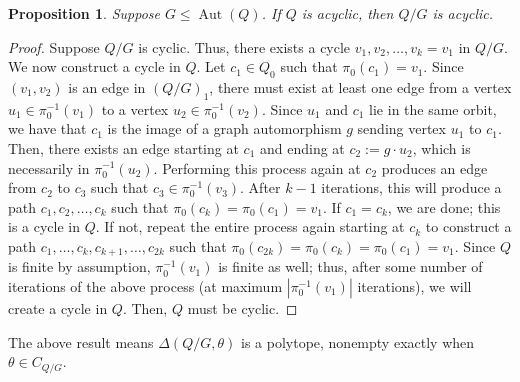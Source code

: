 \documentclass[12pt]{amsart}
\theoremstyle{plain}
\newtheorem{proposition}[theorem]{Proposition}
\theoremstyle{definition}
\DeclareMathOperator{\aut}{Aut}
\begin{document}
\begin{proposition} \label{quotient-acyclic}
    Suppose $G \leq \aut(Q)$. If $Q$ is acyclic, then $Q/G$ is acyclic.
\end{proposition}

\begin{proof}
    Suppose $Q/G$ is cyclic. Thus, there exists a cycle $v_1, v_2, \ldots, v_k =v_1$ in $Q/G$. We now construct a cycle in $Q$. Let $c_1 \in Q_0$ such that $\pi_0(c_1) = v_1$. Since $(v_1, v_2)$ is an edge in $(Q/G)_1$, there must exist at least one edge from a vertex $u_1 \in \pi_0^{-1}(v_1)$ to a vertex $u_2 \in \pi_0^{-1}(v_2)$. Since $u_1$ and $c_1$ lie in the same orbit, we have that $c_1$ is the image of a graph automorphism $g$ sending vertex $u_1$ to $c_1$. Then, there exists an edge starting at $c_1$ and ending at $c_2:= g \cdot u_2$, which is necessarily in $\pi_0^{-1}(u_2)$. Performing this process again at $c_2$ produces an edge from $c_2$ to $c_3$ such that $c_3 \in \pi_0^{-1}(v_3)$. After $k - 1$ iterations, this will produce a path $c_1, c_2, \ldots, c_k$ such that $\pi_0(c_k) = \pi_0(c_1) = v_1$. If $c_1 = c_k$, we are done; this is a cycle in $Q$. If not, repeat the entire process again starting at $c_k$ to construct a path $c_1, \ldots, c_k, c_{k+1}, \ldots, c_{2k}$ such that $\pi_0(c_{2k}) = \pi_0(c_k) = \pi_0(c_1) = v_1$. Since $Q$ is finite by assumption, $\pi_0^{-1}(v_1)$ is finite as well; thus, after some number of iterations of the above process (at maximum $|\pi_0^{-1}(v_1)|$ iterations), we will create a cycle in $Q$. Then, $Q$ must be cyclic.
\end{proof}

The above result means $\Delta(Q/G, \theta)$ is a polytope, nonempty exactly when $\theta \in C_{Q/G}$.
\end{document}
